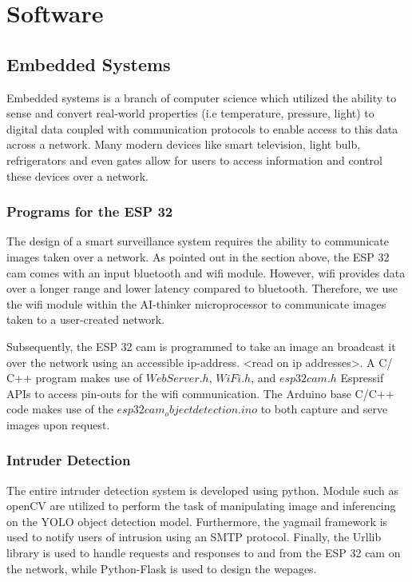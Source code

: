 \documentclass[../../main.tex]{subfiles}
\begin{document}
    \section{Software}
        \subsection{Embedded Systems}
            Embedded systems is a branch of computer science which utilized the ability to sense and convert real-world properties (i.e temperature, pressure, light) to digital data coupled with communication protocols to enable access to this data across a network. Many modern devices like smart television, light bulb, refrigerators and even gates allow for users to access information and control these devices over a network.

            \subsubsection{Programs for the ESP 32}
                The design of a smart surveillance system requires the ability to communicate images taken over a network. As pointed out in the section above, the ESP 32 cam comes with an input bluetooth and wifi module. However, wifi provides data over a longer range and lower latency compared to bluetooth. Therefore, we use the wifi module within the AI-thinker microprocessor to communicate images taken to a user-created network.

                Subsequently, the ESP 32 cam is programmed to take an image an broadcast it over the network using an accessible ip-address. <read on ip addresses>. A C/ C++ program makes use of ${WebServer.h}$, ${WiFi.h}$, and ${esp32cam.h}$ Espressif APIs to access pin-outs for the wifi communication. The Arduino base C/C++ code makes use of the ${esp32cam_objectdetection.ino}$ to both capture and serve images upon request.
            
            \subsubsection{Intruder Detection}
                The entire intruder detection system is developed using python. Module such as openCV are utilized to perform the task of manipulating image and inferencing on the YOLO object detection model. Furthermore, the yagmail framework is used to notify users of intrusion using an SMTP protocol. Finally, the Urllib library is used to handle requests and responses to and from the ESP 32 cam on the network, while Python-Flask is used to design the wepages.
\end{document}

